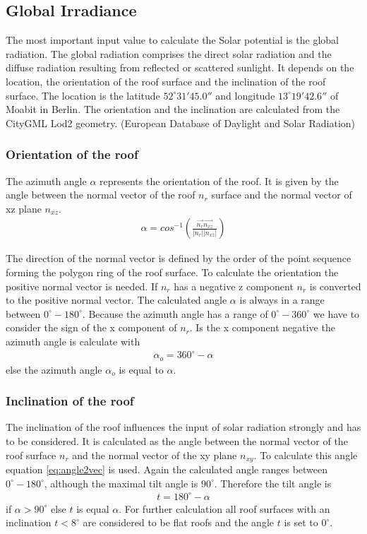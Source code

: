 \subsection{Global Irradiance}

The most important input value to calculate the Solar potential is the global radiation. The global radiation comprises the direct solar radiation and the diffuse radiation resulting from reflected or scattered sunlight. It depends on the location, the orientation of the roof surface and the inclination of the roof surface. The location is the latitude \(52^\circ 31' 45.0''\) and longitude \(13^\circ 19' 42.6''\)  of Moabit in Berlin. The orientation and the inclination are calculated from the CityGML Lod2 geometry. (European Database of Daylight and Solar Radiation)

\subsubsection{Orientation of the roof}

The azimuth angle \(\alpha\) represents the orientation of the roof. It is given by the angle between the normal vector of the roof \(n_r\) surface and the normal vector of xz plane \(n_{xz}\). 
\begin{eqnarray}
\label{eq:angle2vec}
\alpha = cos^{-1} ( \frac{\vec{n_r} \vec{n_{xz}}}{|n_r|  |n_{xz} | })
\end{eqnarray}

The direction of the normal vector is defined by the order of the point sequence forming the polygon ring of the roof surface. To calculate the orientation the positive normal vector is needed. If \(n_r\) has a negative z component \(n_r\) is converted to the positive normal vector. The calculated angle \(\alpha\) is always in a range between \(0^\circ-180^\circ\). Because the azimuth angle has a range of \(0^\circ-360^\circ\) we have to consider the sign of the x component of \(n_r\). Is the x component negative the azimuth angle is calculate with
\begin{eqnarray}
\alpha_o = 360^\circ - \alpha
\end{eqnarray}
else the azimuth angle \(\alpha_o\) is equal to \(\alpha\). 

\subsubsection{Inclination of the roof}
The inclination of the roof influences the input of solar radiation strongly and has to be considered. It is calculated as the angle between the normal vector of the roof surface \(n_r\) and the normal vector of the xy plane \(n_{xy}\). To calculate this angle equation \ref{eq:angle2vec} is used. Again the calculated angle ranges between \(0^\circ-180^\circ\), although the maximal tilt angle is \(90^\circ\). Therefore the tilt angle is
\begin{eqnarray}
t = 180^\circ - \alpha 
\end{eqnarray}
if \(\alpha > 90^\circ\) else \(t\) is equal \(\alpha\). For further calculation all roof surfaces with an inclination \(t<8^\circ\) are considered to be flat roofs and the angle \(t\) is set to \(0^\circ\).

